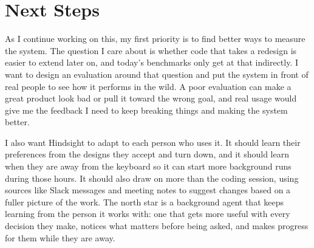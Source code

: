 \section{Next Steps}
\label{sec:discussion}

As I continue working on this, my first priority is to find better ways to measure the system. The question I care about is whether code that takes a redesign is easier to extend later on, and today's benchmarks only get at that indirectly. I want to design an evaluation around that question and put the system in front of real people to see how it performs in the wild. A poor evaluation can make a great product look bad or pull it toward the wrong goal, and real usage would give me the feedback I need to keep breaking things and making the system better.

I also want Hindsight to adapt to each person who uses it. It should learn their preferences from the designs they accept and turn down, and it should learn when they are away from the keyboard so it can start more background runs during those hours. It should also draw on more than the coding session, using sources like Slack messages and meeting notes to suggest changes based on a fuller picture of the work. The north star is a background agent that keeps learning from the person it works with: one that gets more useful with every decision they make, notices what matters before being asked, and makes progress for them while they are away.
